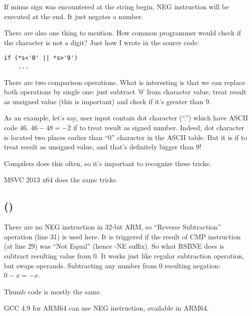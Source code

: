 

If minus sign was encountered at the string begin, 
NEG instruction will be executed at the end.
It just negates a number.

There are also one thing to mention. 
How common programmer would check if the character is not a digit?
Just how I wrote in the source code:

\begin{lstlisting}
if (*s<'0' || *s>'9')
    ...
\end{lstlisting}

There are two comparison operations.
What is interesting is that we can replace both operations by single one: 
just subtract '0' from character value,
treat result as unsigned value (this is important) and check if it's greater than 9.

As an example, let's say, user input contain dot character (``.'') which have \ac{ASCII} code 46.
$46-48=-2$ if to treat result as signed number.
Indeed, dot character is located two places earlier than ``0'' character in the \ac{ASCII} table.
But it is  if to treat result as unsigned value, and that's definitely bigger than 9!

Compilers does this often, so it's important to recognize these tricks.

\Optimizing MSVC 2013 x64 does the same tricks.

\ifdefined\IncludeARM
\subsection{\OptimizingKeilVI (\ARMMode)}



There are no NEG instruction in 32-bit ARM, so ``Reverse Subtraction'' operation (line 31) 
is used here.
It is triggered if the result of CMP instruction (at line 29) was ``Not Equal'' (hence -NE suffix).
So what RSBNE does is subtract resulting value from 0.
It works just like regular subtraction operation, but swaps operands.
Subtracting any number from 0 resulting negation: $0-x=-x$.

Thumb code is mostly the same.

GCC 4.9 for ARM64 can use NEG instruction, available in ARM64.
\fi
\fi
